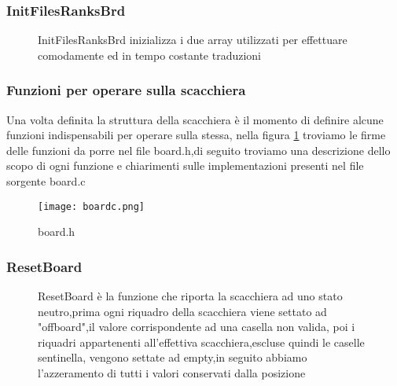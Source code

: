 \subsubsection{InitFilesRanksBrd}

\begin{figure}[h]
    \begin{minipage}[t]{.63\textwidth}
        \centering {}
    \end{minipage}
    \begin{minipage}[t]{0.35\textwidth}
        {InitFilesRanksBrd inizializza i due array utilizzati per effettuare comodamente ed in tempo costante traduzioni }
    \end{minipage}
\end{figure}





\subsubsection{Funzioni per operare sulla scacchiera}
Una volta definita la struttura della scacchiera è il momento di definire alcune funzioni indispensabili per operare sulla stessa,
nella figura \ref{scacchierah} troviamo le firme delle funzioni da porre nel file board.h,di seguito troviamo una descrizione dello scopo di ogni funzione e chiarimenti sulle implementazioni
presenti nel file sorgente board.c
\begin{figure}[H]
    \centering
    \texttt{[image: boardc.png]}
    \caption{ board.h}
    \label{scacchierah}
\end{figure}


\subsubsection{ResetBoard}
\begin{figure}[H]
    \begin{minipage}[t]{.63\textwidth}
        \centering {}
    \end{minipage}
    \begin{minipage}[t]{0.35\textwidth}
        \large{ResetBoard è la funzione che riporta la scacchiera ad uno stato neutro,prima ogni riquadro della scacchiera viene settato ad "offboard",il valore corrispondente ad una casella non valida,
            poi i riquadri appartenenti all'effettiva scacchiera,escluse quindi le caselle sentinella, vengono settate ad empty,in seguito abbiamo l'azzeramento di tutti i valori conservati dalla posizione}
    \end{minipage}
\end{figure}



